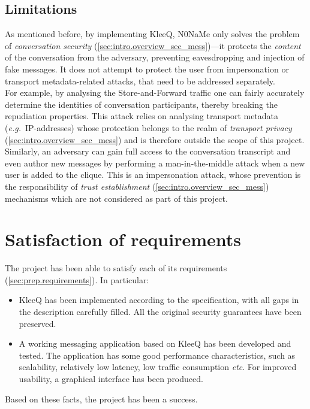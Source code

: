 \documentclass[a4paper, twoside, 12pt]{report}
\newcommand{\funkytt}{\fontfamily{AnonymousPro}\selectfont}
\begin{document}
\subsection{Limitations}
\label{subsec:eval.sec.limit}

As mentioned before, by implementing KleeQ, {\funkytt N0NaMe} only solves the problem of \emph{conversation security} (\cref{sec:intro.overview_sec_mess})---it protects the \emph{content} of the conversation from the adversary, preventing eavesdropping and injection of fake messages. It does not attempt to protect the user from impersonation or transport metadata-related attacks, that need to be addressed separately. \\

For example, by analysing the Store-and-Forward traffic one can fairly accurately determine the identities of conversation participants, thereby breaking the repudiation properties. This attack relies on analysing transport metadata (\textit{e.g.}~IP-addresses) whose protection belongs to the realm of \emph{transport privacy} (\cref{sec:intro.overview_sec_mess}) and is therefore outside the scope of this project. \\

Similarly, an adversary can gain full access to the conversation transcript and even author new messages by performing a man-in-the-middle attack when a new user is added to the clique. This is an impersonation attack, whose prevention is the responsibility of \emph{trust establishment} (\cref{sec:intro.overview_sec_mess}) mechanisms which are not considered as part of this project. 

\section{Satisfaction of requirements}
\label{sec:eval.req}
The project has been able to satisfy each of its requirements (\cref{sec:prep.requirements}). In particular:
\begin{itemize}
    \item KleeQ has been implemented according to the specification, with all gaps in the description carefully filled. All the original security guarantees have been preserved.
    \item A working messaging application based on KleeQ has been developed and tested. The application has some good performance characteristics, such as scalability, relatively low latency, low traffic consumption \textit{etc}. For improved usability, a graphical interface has been produced.
\end{itemize}
Based on these facts, the project has been a success.
\end{document}
